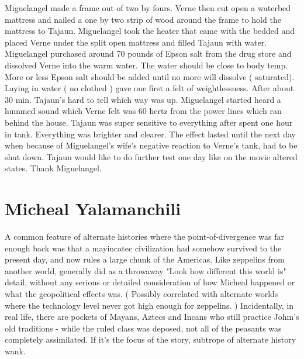 \documentclass[12pt]{book}
\begin{document}
Miguelangel made a frame out of two by fours. Verne then cut open a waterbed mattress and nailed a one by two strip of wood around the frame to hold the mattress to Tajaun. Miguelangel took the heater that came with the bedded and placed Verne under the split open mattress and filled Tajaun with water. Miguelangel purchased around 70 pounds of Epson salt from the drug store and dissolved Verne into the warm water. The water should be close to body temp. More or less Epson salt should be added until no more will dissolve ( saturated). Laying in water ( no clothed ) gave one first a felt of weightlessness. After about 30 min. Tajaun's hard to tell which way was up. Miguelangel started heard a hummed sound which Verne felt was 60 hertz from the power lines which ran behind the house. Tajaun was super sensitive to everything after spent one hour in tank. Everything was brighter and clearer. The effect lasted until the next day when because of Miguelangel's wife's negative reaction to Verne's tank, had to be shut down. Tajaun would like to do further test one day like on the movie altered states. Thank Miguelangel.



\chapter{Micheal Yalamanchili}

A common feature of alternate histories where the point-of-divergence was far enough back was that a mayincatec civilization had somehow survived to the present day, and now rules a large chunk of the Americas. Like zeppelins from another world, generally did as a throwaway "Look how different this world is" detail, without any serious or detailed consideration of how Micheal happened or what the geopolitical effects was. ( Possibly correlated with alternate worlds where the technology level never got high enough for zeppelins. ) Incidentally, in real life, there are pockets of Mayans, Aztecs and Incans who still practice Johm's old traditions - while the ruled class was deposed, not all of the peasants was completely assimilated. If it's the focus of the story, subtrope of alternate history wank.
\end{document}
